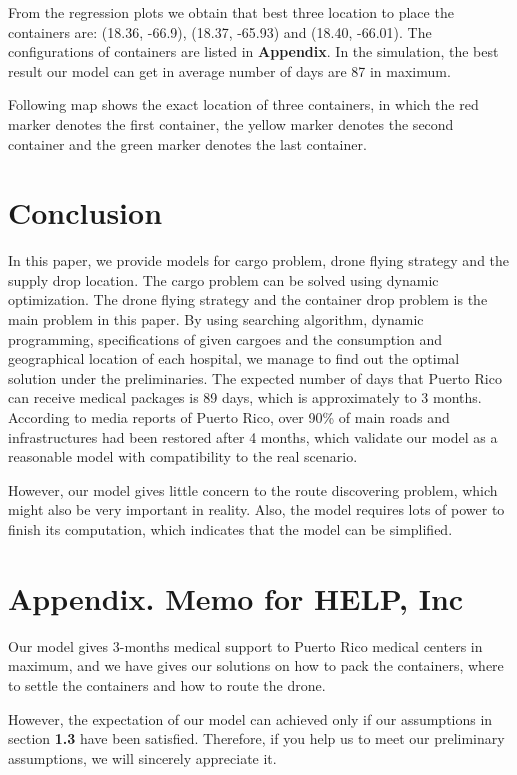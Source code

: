 \documentclass[12pt]{article}
\begin{document}
		From the regression plots we obtain that best three location to place the containers are: (18.36, -66.9), (18.37, -65.93) and (18.40, -66.01). The configurations of containers are listed in \textbf{Appendix}. In the simulation, the best result our model can get in average number of days are 87 in maximum.\par 
		Following map shows the exact location of three containers, in which the red marker denotes the first container, the yellow marker denotes the second container and the green marker denotes the last container.
		\begin{figure}[H]
			\centering
		\end{figure}
	
	\section{Conclusion}
	In this paper, we provide models for cargo problem, drone flying strategy and the supply drop location. The cargo problem can be solved using dynamic optimization. The drone flying strategy and the container drop problem is the main problem in this paper. By using searching algorithm, dynamic programming, specifications of given cargoes and the consumption and geographical location of each hospital, we manage to find out the optimal solution under the preliminaries. The expected number of days that Puerto Rico can receive medical packages is 89 days, which is approximately to 3 months. According to media reports of Puerto Rico, over 90\% of main roads and infrastructures had been restored after 4 months, which validate our model as a reasonable model with compatibility to the real scenario. \par 
	
	However, our model gives little concern to the route discovering problem, which might also be very important in reality. Also, the model requires lots of power to finish its computation, which indicates that the model can be simplified.

	\section{Appendix. Memo for HELP, Inc}
	Our model gives 3-months medical support to Puerto Rico medical centers in maximum, and we have gives our solutions on how to pack the containers, where to settle the containers and how to route the drone. \par 
	However, the expectation of our model can achieved only if our assumptions in section \textbf{1.3} have been satisfied. Therefore, if you help us to meet our preliminary assumptions, we will sincerely appreciate it. \par 
	
\end{document}

